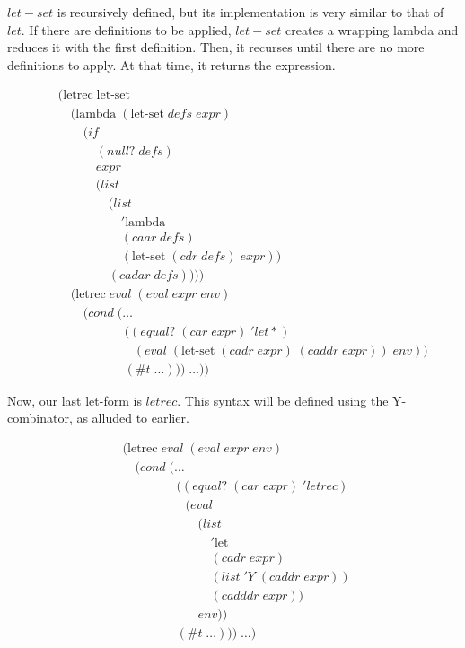 $let-set$ is recursively defined, but its implementation is very similar to
that of $let$. If there are definitions to be applied, $let-set$ creates a
wrapping lambda and reduces it with the first definition. Then, it recurses
until there are no more definitions to apply. At that time, it returns the
expression.

\begin{figure}[ht]
\caption{}\label{scheme}
\begin{align*}
& (\text{letrec} \; \text{let-set} \; 
\\& \quad (\text{lambda} \; (\text{let-set} \; defs \; expr)
\\& \qquad (if
\\& \qquad \quad (null? \; defs)
\\& \qquad \quad expr
\\& \qquad \quad (list \; 
\\& \qquad \qquad (list \; 
\\& \qquad \qquad \quad '\text{lambda} \; 
\\& \qquad \qquad \quad (caar \; defs) \; 
\\& \qquad \qquad \quad (\text{let-set} \; (cdr \; defs) \; expr)) \; 
\\& \qquad \qquad (cadar \; defs))))
\\& \quad (\text{letrec} \; eval \; (eval \; expr \; env)
\\& \qquad (cond \; (\dots
\\& \qquad \qquad \quad \; ((equal? \; (car \; expr) \; 'let*) \; 
\\& \qquad \qquad \qquad (eval \; (\text{let-set} \; (cadr \; expr) \; (caddr \; expr)) \; env))
\\& \qquad \qquad \quad \; (\#t \; \dots))) \; \dots))
\end{align*}
\end{figure}

Now, our last let-form is $letrec$. This syntax will be defined using the Y-
combinator, as alluded to earlier.

\begin{figure}[ht]
\caption{}\label{scheme}
\begin{align*}
& (\text{letrec} \; eval \; (eval \; expr \; env)
\\& \quad (cond \; (\dots
\\& \qquad \qquad \; ((equal? \; (car \; expr) \; 'letrec)
\\& \qquad \qquad \quad (eval
\\& \qquad \qquad \qquad (list \; 
\\& \qquad \qquad \qquad \quad '\text{let} \; 
\\& \qquad \qquad \qquad \quad (cadr \; expr) \; 
\\& \qquad \qquad \qquad \quad (list \; 'Y \; (caddr \; expr)) \; 
\\& \qquad \qquad \qquad \quad (cadddr \; expr))
\\& \qquad \qquad \qquad env))
\\& \qquad \qquad \; (\#t \; \dots))) \; \dots)
\end{align*}
\end{figure}

